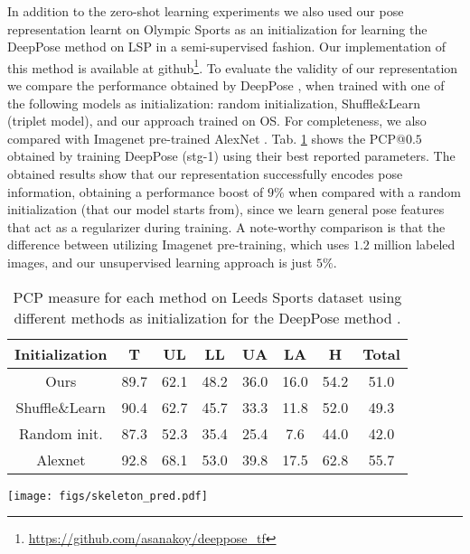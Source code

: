 \documentclass[10pt,twocolumn,letterpaper]{article}
\begin{document}
In addition to the zero-shot learning experiments we also used our pose representation learnt on Olympic Sports as an initialization for learning the DeepPose method \cite{deeppose} on LSP in a semi-supervised fashion. Our implementation of this method is available at github\footnote{\url{https://github.com/asanakoy/deeppose_tf}}. To evaluate the validity of our representation we compare the performance obtained by DeepPose \cite{deeppose}, when trained with one of the following models as initialization: random initialization, Shuffle\&Learn \cite{shuffleandlearn} (triplet model), and our approach trained on OS. For completeness, we also compared with Imagenet pre-trained AlexNet \cite{alexnet}. Tab. \ref{tab:results_lsp_deeppose} shows the PCP@$0.5$ obtained by training DeepPose (stg-1) using their best reported parameters. The obtained results show that our representation successfully encodes pose information, obtaining a performance boost of $9\%$ when compared with a random initialization (that our model starts from), since we learn general pose features that act as a regularizer during training. A note-worthy comparison is that the difference between utilizing Imagenet pre-training, which uses $1.2$ million labeled images, and our unsupervised learning approach is just $5\%$.

\begin{table}[!t]
    \scriptsize
    \centering
    \begin{tabular}{|c|c|c|c|c|c|c|c|}
    \hline
    Initialization  &T &UL &LL &UA &LA &H  &Total \\
    \hline
    Ours & 89.7 & 62.1 & 48.2 & 36.0 & 16.0 & 54.2 &  51.0\\
    \hline
    Shuffle\&Learn \cite{shuffleandlearn} & 90.4 & 62.7 & 45.7 & 33.3 & 11.8 & 52.0 &  49.3\\
    \hline
    Random init. & 87.3 & 52.3 & 35.4 & 25.4 & 7.6 & 44.0 &  42.0\\
    \hline
    \hline
    Alexnet \cite{alexnet} & 92.8 & 68.1 & 53.0 & 39.8 & 17.5 & 62.8 &  55.7\\
    \hline
    \end{tabular}
    \caption{PCP measure for each method on Leeds Sports dataset using different methods as initialization for the DeepPose method \cite{deeppose}.}
    \label{tab:results_lsp_deeppose}
\end{table}


\begin{figure*}
\texttt{[image: figs/skeleton\_pred.pdf]}
\caption{Top row: Heatmaps obtained by DeepPose (stg-1) \cite{deeppose} trained on LSP, highlighted in red. Bottom row: Heatmaps obtained by our zero-shot unsupervised approach, highlighted in green.}
\label{fig:heatmap_pred}
\end{figure*}
\end{document}
